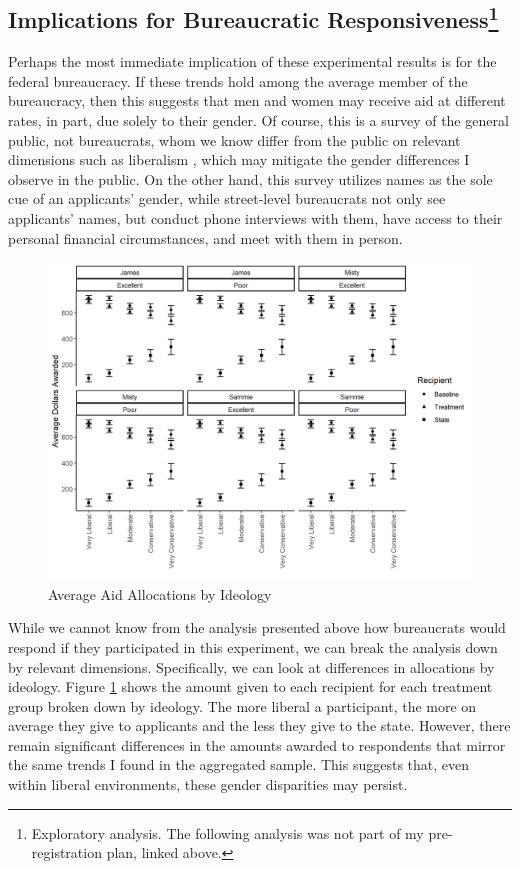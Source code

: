 \documentclass[12pt]{article}%
\begin{document}
\begin{doublespace}
\section*{Implications for Bureaucratic Responsiveness\footnote{Exploratory analysis. The following analysis was not part of my pre-registration plan, linked above.}}
Perhaps the most immediate implication of these experimental results is for the federal bureaucracy. If these trends hold among the average member of the bureaucracy, then this suggests that men and women may receive aid at different rates, in part, due solely to their gender. Of course, this is a survey of the general public, not bureaucrats, whom we know differ from the public on relevant dimensions such as liberalism \citep{spenkuch_ideology_2021}, which may mitigate the gender differences I observe in the public. On the other hand, this survey utilizes names as the sole cue of an applicants’ gender, while street-level bureaucrats not only see applicants’ names, but conduct phone interviews with them, have access to their personal financial circumstances, and meet with them in person.

\begin{figure}[H]
	\centering
	\includegraphics[scale=.8]{figs/robust_result_ideo.png}
	\caption{Average Aid Allocations by Ideology}
	\label{ideology}
\end{figure}


While we cannot know from the analysis presented above how bureaucrats would respond if they participated in this experiment, we can break the analysis down by relevant dimensions. Specifically, we can look at differences in allocations by ideology. Figure \ref{ideology} shows the amount given to each recipient for each treatment group broken down by ideology. The more liberal a participant, the more on average they give to applicants and the less they give to the state. However, there remain significant differences in the amounts awarded to respondents that mirror the same trends I found in the aggregated sample. This suggests that, even within liberal environments, these gender disparities may persist.


\end{doublespace}
\end{document}
